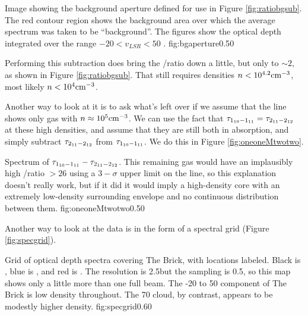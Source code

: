 {Image showing the background aperture defined for use in Figure \ref{fig:ratiobgsub}.  The red contour region
shows the background area over which the average spectrum was taken to be ``background''.  
The \formaldehyde figures show the optical depth integrated over the range $-20 < v_{LSR} < 50$ \kms.}
{fig:bgaperture}{0.5}{0}

Performing this subtraction does bring the \oneone/\twotwo ratio down a little,
but only to $\sim2$, as shown in Figure \ref{fig:ratiobgsub}.  That still
requires densities $n<10^{4.2} \textrm{cm}^{-3}$, most likely $n<10^4 \textrm{cm}^{-3}$.

Another way to look at it is to ask what's left over if we assume that the \twotwo line shows
only gas with $n\approx10^5\textrm{cm}^{-3}$.  We can use the fact that $\tau_{1_{10}-1_{11}} = \tau_{2_{11}-2_{12}}$ 
at these high densities, and assume that they are still both in absorption, and simply subtract
$\tau_{2_{11}-2_{12}}$ from $\tau_{1_{10}-1_{11}}$.  We do this in Figure \ref{fig:oneoneMtwotwo}.

{Spectrum of $\tau_{1_{10}-1_{11}} - \tau_{2_{11}-2_{12}}$.  This remaining gas would have an implausibly
high \oneone/\twotwo ratio $ > 26$ using a $3-\sigma$ upper limit on the \twotwo line, so 
this explanation doesn't really work, but if it did it would imply a high-density core with an extremely low-density
surrounding envelope and no continuous distribution between them.}
{fig:oneoneMtwotwo}{0.5}{0}

Another way to look at the data is in the form of a spectral grid (Figure \ref{fig:specgrid}).


{Grid of optical depth spectra covering The Brick, with locations labeled.
Black is \formaldehyde \oneone, blue is \formaldehydeIso \oneone, and red is
\formaldehyde \twotwo.  The resolution is 2.5\arcmin but the sampling is
0.5\arcmin, so this map shows only a little more than one full beam.  The -20
to 50 \kms component of The Brick is low density throughout.  The 70 \kms
cloud, by contrast, appears to be modestly higher density.}
{fig:specgrid}{0.6}{0}




